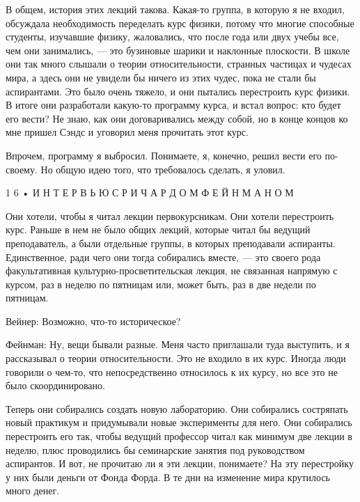 \documentclass[11pt,oneside]{article}
\begin{document}
В общем, история этих лекций такова. Какая-то группа, в которую я не входил, обсуждала необходимость переделать курс физики, потому что многие способные студенты, изучавшие физику, жаловались, что после года или двух учебы все, чем они занимались, --- это бузиновые шарики и наклонные плоскости. В школе они так много слышали о теории относительности, странных частицах и чудесах мира, а здесь они не увидели бы ничего из этих чудес, пока не стали бы аспирантами. Это было очень тяжело, и они пытались перестроить курс физики. В итоге они разработали какую-то программу курса, и встал вопрос: кто будет его вести? Не знаю, как они договаривались между собой, но в конце концов ко мне пришел Сэндс и уговорил меня прочитать этот курс.\par



Впрочем, программу я выбросил. Понимаете, я, конечно, решил вести его по-своему. Но общую идею того, что требовалось сделать, я уловил.\par



1 6 • И Н Т Е Р В Ь Ю  С  Р И Ч А Р Д О М  Ф Е Й Н М А Н О М\par



Они хотели, чтобы я читал лекции первокурсникам. Они хотели перестроить курс. Раньше в нем не было общих лекций, которые читал бы ведущий преподаватель, а были отдельные группы, в которых преподавали аспиранты. Единственное, ради чего они тогда собирались вместе, --- это своего рода факультативная культурно-просветительская лекция, не связанная напрямую с курсом, раз в неделю по пятницам или, может быть, раз в две недели по пятницам.\par



Вейнер: Возможно, что-то историческое?\par



Фейнман: Ну, вещи бывали разные. Меня часто приглашали туда выступить, и я рассказывал о теории относительности. Это не входило в их курс. Иногда люди говорили о чем-то, что непосредственно относилось к их курсу, но все это не было скоординировано.\par



Теперь они собирались создать новую лабораторию. Они собирались состряпать новый практикум и придумывали новые эксперименты для него. Они собирались перестроить его так, чтобы ведущий профессор читал как минимум две лекции в неделю, плюс проводились бы семинарские занятия под руководством аспирантов. И вот, не прочитаю ли я эти лекции, понимаете? На эту перестройку у них были деньги от Фонда Форда. В те дни на изменение мира крутилось много денег.\par
\end{document}
